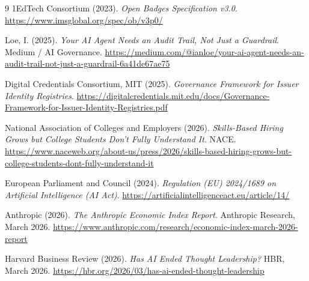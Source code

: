 \documentclass[11pt,a4paper]{article}
\begin{document}
\begin{thebibliography}{9}
1EdTech Consortium (2023).
\textit{Open Badges Specification v3.0}.
\url{https://www.imsglobal.org/spec/ob/v3p0/}

Loe, I. (2025).
\textit{Your AI Agent Needs an Audit Trail, Not Just a Guardrail}.
Medium / AI Governance. \url{https://medium.com/@ianloe/your-ai-agent-needs-an-audit-trail-not-just-a-guardrail-6a41de67ae75}

Digital Credentials Consortium, MIT (2025).
\textit{Governance Framework for Issuer Identity Registries}.
\url{https://digitalcredentials.mit.edu/docs/Governance-Framework-for-Issuer-Identity-Registries.pdf}

National Association of Colleges and Employers (2026).
\textit{Skills-Based Hiring Grows but College Students Don't Fully Understand It}.
NACE. \url{https://www.naceweb.org/about-us/press/2026/skills-based-hiring-grows-but-college-students-dont-fully-understand-it}

European Parliament and Council (2024).
\textit{Regulation (EU) 2024/1689 on Artificial Intelligence (AI Act)}.
\url{https://artificialintelligenceact.eu/article/14/}

Anthropic (2026).
\textit{The Anthropic Economic Index Report}.
Anthropic Research, March 2026. \url{https://www.anthropic.com/research/economic-index-march-2026-report}

Harvard Business Review (2026).
\textit{Has AI Ended Thought Leadership?}
HBR, March 2026. \url{https://hbr.org/2026/03/has-ai-ended-thought-leadership}

\end{thebibliography}
\end{document}
